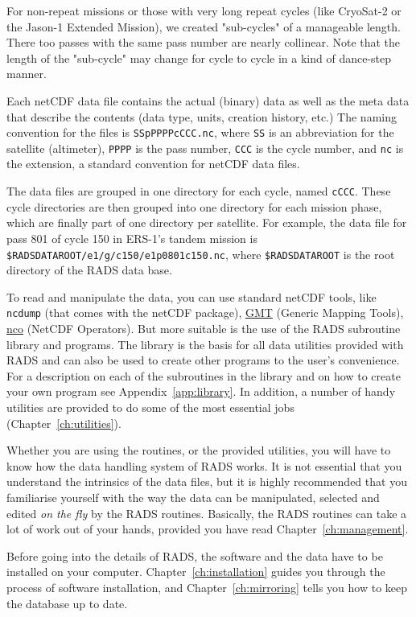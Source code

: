 \documentclass[a4paper,11pt,openany,natbib,nomargin]{thesis}
\makeatletter
\newcommand\prog[1]{\url{#1}\index{programs!#1@\protect\url{#1}}}
\makeatother
\begin{document}
For non-repeat missions or those with very long repeat cycles (like CryoSat-2 or the Jason-1 Extended Mission), we created "sub-cycles" of a manageable length. There too passes with the same pass number are nearly collinear. Note that the length of the "sub-cycle" may change for cycle to cycle in a kind of dance-step manner.

Each netCDF data file contains the actual (binary) data as well as the meta data that describe the contents (data type, units, creation history, etc.) The naming convention for the files is \verb|SSpPPPPcCCC.nc|, where \verb|SS| is an abbreviation for the satellite (altimeter), \verb|PPPP| is the pass number, \verb|CCC| is the cycle number, and \verb|nc| is the extension, a standard convention for netCDF data files.

The data files are grouped in one directory for each cycle, named \verb|cCCC|. These cycle directories are then grouped into one directory for each mission phase, which are finally part of one directory per satellite. For example, the data file for pass 801 of cycle 150 in ERS-1's tandem mission is \verb|$RADSDATAROOT/e1/g/c150/e1p0801c150.nc|, where \verb|$RADSDATAROOT| is the root directory of the RADS data base.

To read and manipulate the data, you can use standard netCDF tools, like \verb|ncdump| (that comes with the netCDF package), \prog{GMT} (Generic Mapping Tools), \prog{nco} (NetCDF Operators). But more suitable is the use of the RADS subroutine library and programs. The library is the basis for all data utilities provided with RADS and can also be used to create other programs to the user's convenience. For a description on each of the subroutines in the library and on how to create your own program see Appendix~\ref{app:library}. In addition, a number of handy utilities are provided to do some of the most essential jobs (Chapter~\ref{ch:utilities}).

Whether you are using the routines, or the provided utilities, you will have to know how the data handling system of RADS works. It is not essential that you understand the intrinsics of the data files, but it is highly recommended that you familiarise yourself with the way the data can be manipulated, selected and edited \emph{on the fly} by the RADS routines. Basically, the RADS routines can take a lot of work out of your hands, provided you have read Chapter~\ref{ch:management}.

Before going into the details of RADS, the software and the data have to be installed on your computer. Chapter~\ref{ch:installation} guides you through the process of software installation, and Chapter~\ref{ch:mirroring} tells you how to keep the database up to date.
\end{document}
